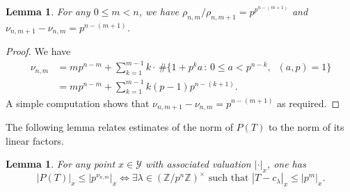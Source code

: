 \documentclass[10pt, oneside]{amsart}
\numberwithin{equation}{subsection}
\newtheorem{lemma}[equation]{Lemma}
\theoremstyle{definition}
\theoremstyle{remark}
\def\Z{{\mathbb{Z}}}
\begin{document}
\begin{lemma} \label{rhoquotientlemma}
For any $0 \leq m < n$, we have $\rho_{n,m} / \rho_{n,m+1} = p^{p^{n - (m + 1)}}$ and $\nu_{n, m+1} - \nu_{n, m} = p^{n-(m+1)}$.
\end{lemma}

\begin{proof}
We have
\begin{align*} \nu_{n, m} &= m p^{n - m} + \sum_{k = 1}^{m - 1} k \cdot \, \# \{ 1+p^k a \, : \, 0 \leq a < p^{n-k}, \;\; (a, p) = 1\} \\ 
&= m p^{n - m} + \sum_{k = 1}^{m - 1} k (p-1) p^{n - (k+1)}.
\end{align*}
A simple computation shows that $\nu_{n, m+1} - \nu_{n, m} = p^{n - (m+1)}$ as required.
\end{proof}

The following lemma relates estimates of the norm of $P(T)$ to the norm of its linear factors.

\begin{lemma} \label{LemmaInequality}
For any point $x \in \mathcal{Y}$ with associated valuation $| \cdot |_x$, one has
\[ 
|P(T)|_x \leq |p^{\nu_{n, m}}|_x \Longleftrightarrow \exists \lambda \in (\Z / p^n \Z)^\times \text{ such that } |T - c_{\lambda} |_x  \leq |p^m|_x.
\]
\end{lemma}
\end{document}
